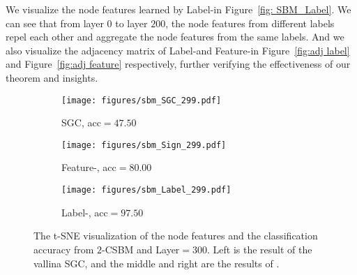We visualize the node features learned by Label-\ours in Figure~\ref{fig: SBM_Label}.
We can see that from layer $0$ to layer $200$, the node features from different labels repel each other and aggregate the node features from the same labels.
And we also visualize the adjacency matrix of Label-\ours and Feature-\ours in Figure~\ref{fig:adj label} and Figure~\ref{fig:adj feature} respectively, further verifying the effectiveness of our theorem and insights.
\begin{figure}[h]
    \centering
    \begin{subfigure}[b]{0.28\textwidth}
        \centering
        \texttt{[image: figures/sbm\_SGC\_299.pdf]} %
        \caption{SGC, acc$=47.50$}
        \label{fig:overall matrix}
    \end{subfigure}
    \quad
    \begin{subfigure}[b]{0.28\textwidth}
        \centering
        \texttt{[image: figures/sbm\_Sign\_299.pdf]}
        \caption{Feature-\ours, acc$=80.00$}
        \label{fig:sbm_sgc}
    \end{subfigure}
    \quad
    \begin{subfigure}[b]{0.28\textwidth}
        \centering
        \texttt{[image: figures/sbm\_Label\_299.pdf]} %
        \caption{Label-\ours, acc$=97.50$}
        \label{fig:sbm_ours}
    \end{subfigure}
    
    \caption{The t-SNE visualization of the node features and the classification accuracy from $2$-CSBM and Layer$=300$. 
    Left is the result of the vallina SGC, and the middle and right are the results of \ours. }
    \label{fig: sbm overall}
\end{figure}
